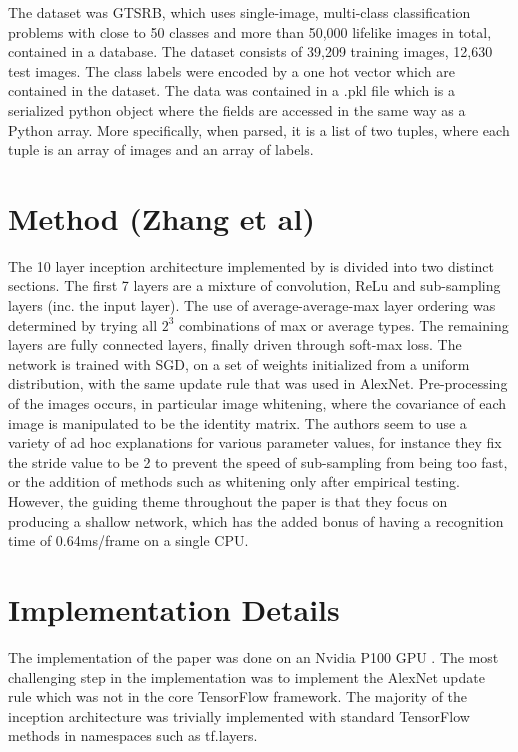 \documentclass[conference]{IEEEtran}
\begin{document}
The dataset was GTSRB, which uses single-image, multi-class classification problems with close to 50 classes and more than 50,000 lifelike images in total, contained in a database. The dataset consists of 39,209 training images, 12,630 test images. The class labels were encoded by a one hot vector which are contained in the dataset. The data was contained in a .pkl file which is a serialized python object where the fields are accessed in the same way as a Python array. More specifically, when parsed, it is a list of two tuples, where each tuple is an array of images and an array of labels.

\section{Method (Zhang et al)}

The 10 layer inception architecture implemented by \cite{ZhangsMainPaper} is divided into two distinct sections. The first 7 layers are a mixture of convolution, ReLu and sub-sampling layers (inc. the input layer). The use of average-average-max layer ordering was determined by trying all $2^{3}$ combinations of max or average types. The remaining layers are fully connected layers, finally driven through soft-max loss. The network is trained with SGD, on a set of weights initialized from a uniform distribution, with the same update rule that was used in AlexNet. Pre-processing of the images occurs, in particular image whitening, where the covariance of each image is manipulated to be the identity matrix. The authors seem to use a variety of ad hoc explanations for various parameter values, for instance they fix the stride value to be 2 to prevent the speed of sub-sampling from being too fast, or the addition of methods such as whitening only after empirical testing. However, the guiding theme throughout the paper is that they focus on producing a shallow network, which has the added bonus of having a recognition time of 0.64ms/frame on a single CPU.

\section{Implementation Details}

The implementation of the paper was done on an Nvidia P100 GPU \cite{TeslaP100}. The most challenging step in the implementation was to implement the AlexNet update rule which was not in the core TensorFlow framework. The majority of the inception architecture was trivially implemented with standard TensorFlow methods in namespaces such as tf.layers. 
\end{document}
